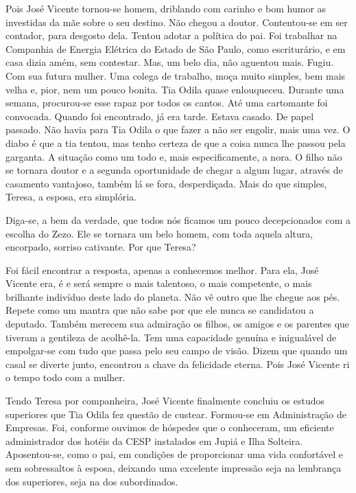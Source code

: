 Pois José Vicente tornou-se homem, driblando com carinho e bom humor as investidas da mãe sobre o seu destino.
Não chegou a doutor.
Contentou-se em ser contador, para desgosto dela.
Tentou adotar a política do pai.
Foi trabalhar na Companhia de Energia Elétrica do Estado de São Paulo, como escriturário, e em casa dizia amém, sem contestar.
Mas, um belo dia, não aguentou mais.
Fugiu.
Com sua futura mulher.
Uma colega de trabalho, moça muito simples, bem mais velha e, pior, nem um pouco bonita.
Tia Odila quase enlouqueceu.
Durante uma semana, procurou-se esse rapaz por todos os cantos.
Até uma cartomante foi convocada.
Quando foi encontrado, já era tarde.
Estava casado.
De papel passado.
Não havia para Tia Odila o que fazer a não ser engolir, mais uma vez.
 O diabo é que a tia tentou, mas tenho certeza de que a coisa nunca lhe passou pela garganta.
A situação como um todo e, mais especificamente, a nora.
O filho não se tornara doutor e a segunda oportunidade de chegar a algum lugar, através de casamento vantajoso, também lá se fora, desperdiçada.
Mais do que simples, Teresa, a esposa, era simplória.

Diga-se, a bem da verdade, que todos nós ficamos um pouco decepcionados com a escolha do Zezo.
Ele se tornara um belo homem, com toda aquela altura, encorpado, sorriso cativante.
Por que Teresa?
 
Foi fácil encontrar a resposta, apenas a conhecemos melhor.
Para ela, José Vicente era, é e será sempre o mais talentoso, o mais competente, o mais brilhante indivíduo deste lado do planeta.
Não vê outro que lhe chegue aos pés.
Repete como um mantra que não sabe por que ele nunca se candidatou a deputado.
Também merecem sua admiração os filhos, os amigos e os parentes que tiveram a gentileza de acolhê-la.
Tem uma capacidade genuína e inigualável de empolgar-se com tudo que passa pelo seu campo de visão.
Dizem que quando um casal se diverte junto, encontrou a chave da felicidade eterna.
Pois José Vicente ri o tempo todo com a mulher.


Tendo Teresa por companheira, José Vicente finalmente concluiu os estudos superiores que Tia Odila fez questão de custear.
Formou-se em Administração de Empresas.
Foi, conforme ouvimos de hóspedes que o conheceram, um eficiente administrador dos hotéis da CESP instalados em Jupiá e Ilha Solteira.
Aposentou-se, como o pai, em condições de proporcionar uma vida confortável e sem sobressaltos à esposa, deixando uma excelente impressão seja na lembrança dos superiores, seja na dos subordinados.

